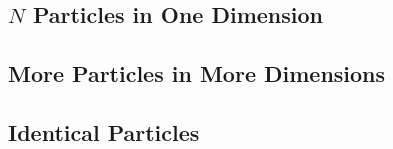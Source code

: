 \subsection{$N$ Particles in One Dimension}

\subsection{More Particles in More Dimensions}

\subsection{Identical Particles}
